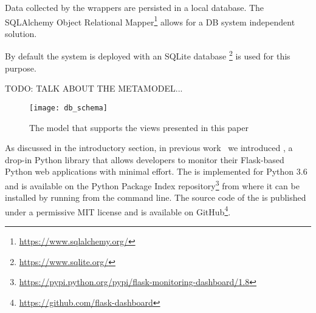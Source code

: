   Data collected by the wrappers are persisted in a local database. The SQLAlchemy Object Relational Mapper\footnote{\url{https://www.sqlalchemy.org/}} allows for a DB system independent solution. 

  By default the system is deployed with an SQLite database \footnote{\url{https://www.sqlite.org/}} is used for this purpose.

TODO: TALK ABOUT THE METAMODEL...


    \begin{figure}[ht!]
      \centering
        \texttt{[image: db\_schema]}
        \caption{The model that supports the views presented in this paper}
        \label{fig:sep}
    \end{figure}

  As discussed in the introductory section, in previous work~\cite{vogel2017low} we introduced \tool, a drop-in Python library that allows developers to monitor their Flask-based Python web applications with minimal effort.
%
  The \tool is implemented for Python 3.6 and is available on the Python Package Index repository\footnote{\url{https://pypi.python.org/pypi/flask-monitoring-dashboard/1.8}} from where it can be installed by running \install from the command line. 
%  
  The source code of the \tool is published under a permissive MIT license and is available on GitHub\footnote{\url{https://github.com/flask-dashboard}}.
  
  


